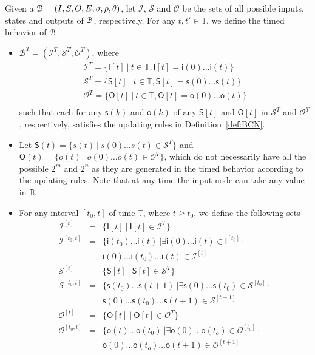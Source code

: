 Given a {\BCN} ${\mathcal{B}} = (I,S,O, E, \sigma, \rho,\theta)$, let $\mathcal{I}$, $\mathcal{S}$ and $\mathcal{O}$ be the sets of all possible inputs, states and outputs of ${\mathcal{B}}$, respectively. For any $t,t' \in \mathbb{T}$, we define the timed behavior of ${\mathcal{B}}$
\begin{itemize}
\item $\mathcal{B}^T = (\mathcal{I}^T, \mathcal{S}^T, \mathcal{O}^T)$,  where 
{\small \[\begin{array}{llll}
\mathcal{I}^T =\{\mathsf{I}[t]~|~ t\in \mathbb{T}, \mathsf{I}[t]=\mathsf{i}(0)\ldots \mathsf{i}(t)\}\\
\mathcal{S}^T =\{\mathsf{S}[t]~|~ t\in \mathbb{T}, \mathsf{S}[t]=\mathsf{s}(0)\ldots \mathsf{s}(t)\}\\
\mathcal{O}^T =\{\mathsf{O}[t]~|~ t\in \mathbb{T}, \mathsf{O}[t]=\mathsf{o}(0)\ldots \mathsf{o}(t)\}\\
\end{array}
\]} such that each for any $\mathsf{s}(k)$ and $\mathsf{o}(k)$ of any $\mathsf{S}[t]$ and 
$\mathsf{O}[t]$ in $\mathcal{S}^T$ and $\mathcal{O}^T$, respectively,   satisfies the updating rules in Definition~\ref{def:BCN}.
\item Let $\mathsf{S}(t) = \{ s(t)~|~ s(0)\ldots s(t) \in \mathcal{S}^T\}$ and $\mathsf{O}(t) = \{ o(t)~|~ o(0)\ldots o(t) \in \mathcal{O}^T\}$, which do not necessarily have all the possible $2^m$ and $2^n$ as they are generated in the timed behavior according to the updating rules. Note that at any time the input node can take any value in $\mathbb{B}$.
\item For any interval  $[t_0,t]$ of time $\mathbb{T}$, where $t\geq t_0$, we define the following sets 
\[\begin{array}{llllll}
\mathcal{I}^{[t]} &=& \{\mathsf{I}[t] ~|~ \mathsf{I}[t]\in \mathcal{I}^T\}\\
\mathcal{I}^{[t_0,t]} &=& \{\mathsf{i}(t_0)\ldots \mathsf{i}(t)~|\exists \mathsf{i}(0)\ldots \mathsf{i}(t)\in \mathsf{I}^{[t_0]}\cdot\\
&& \mathsf{i}(0)\ldots \mathsf{i}(t_0) \ldots \mathsf{i}(t)\in \mathcal{I}^{[t]} \\
\mathcal{S}^{[t]} &=& \{\mathsf{S}[t] ~|~ \mathsf{S}[t]\in \mathcal{S}^T\}\\
\mathcal{S}^{[t_0,t]} &=& \{\mathsf{s}(t_0)\ldots \mathsf{s}(t+1)~|\exists \mathsf{s}(0)\ldots \mathsf{s}(t_0)\in \mathcal{S}^{[t_0]}\cdot\\
&& \mathsf{s}(0)\ldots \mathsf{s}(t_0) \ldots \mathsf{s}(t+1)\in \mathcal{S}^{[t+1]} \\
\mathcal{O}^{[t]} &=& \{\mathsf{O}[t] ~|~ \mathsf{O}[t]\in \mathcal{O}^T\}\\
\mathcal{O}^{[t_0,t]} &=& \{\mathsf{o}(t)\ldots \mathsf{o}(t_0)~|\exists \mathsf{o}(0)\ldots \mathsf{o}(t_o)\in \mathcal{O}^{[t_0]}\cdot\\
&& \mathsf{o}(0)\ldots \mathsf{o}(t_o) \ldots \mathsf{o}(t+1)\in \mathcal{O}^{[t+1]} \\
\end{array}
\]
\end{itemize} 
